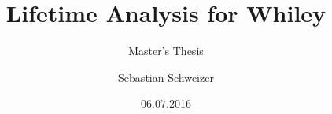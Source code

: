 \documentclass[%
	aspectratio=169,%
	10pt,%
	compress,%
]{beamer}
\title{Lifetime Analysis for Whiley}
\subtitle{Master's Thesis}
\author{Sebastian Schweizer}
\date{06.07.2016}
\begin{document}
\begin{frame}
	\titlepage
\end{frame}






\end{document}
